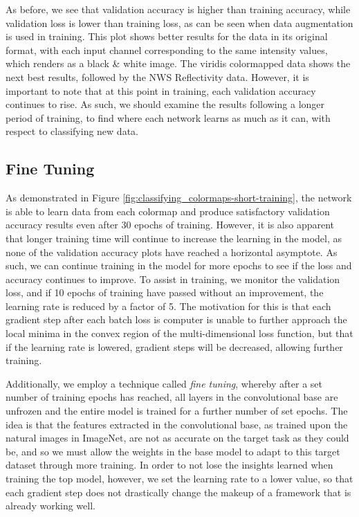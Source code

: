 As before, we see that validation accuracy is higher than training accuracy, while validation loss is lower than training loss, as can be seen when data augmentation is used in training.
This plot shows better results for the data in its original format, with each input channel corresponding to the same intensity values, which renders as a black \& white image.
The viridis colormapped data shows the next best results, followed by the NWS Reflectivity data.
However, it is important to note that at this point in training, each validation accuracy continues to rise.
As such, we should examine the results following a longer period of training, to find where each network learns as much as it can, with respect to classifying new data.

\subsection{Fine Tuning}
\label{ssec:classifying_finetuning}

As demonstrated in Figure \ref{fig:classifying_colormaps-short-training}, the network is able to learn data from each colormap and produce satisfactory validation accuracy results even after 30 epochs of training.
However, it is also apparent that longer training time will continue to increase the learning in the model, as none of the validation accuracy plots have reached a horizontal asymptote.
As such, we can continue training in the model for more epochs to see if the loss and accuracy continues to improve.
To assist in training, we monitor the validation loss, and if 10 epochs of training have passed without an improvement, the learning rate is reduced by a factor of 5.
The motivation for this is that each gradient step after each batch loss is computer is unable to further approach the local minima in the convex region of the multi-dimensional loss function, but that if the learning rate is lowered, gradient steps will be decreased, allowing further training.

Additionally, we employ a technique called \textit{fine tuning}, whereby after a set number of training epochs has reached, all layers in the convolutional base are unfrozen and the entire model is trained for a further number of set epochs.
The idea is that the features extracted in the convolutional base, as trained upon the natural images in ImageNet, are not as accurate on the target task as they could be, and so we must allow the weights in the base model to adapt to this target dataset through more training.
In order to not lose the insights learned when training the top model, however, we set the learning rate to a lower value, so that each gradient step does not drastically change the makeup of a framework that is already working well.

